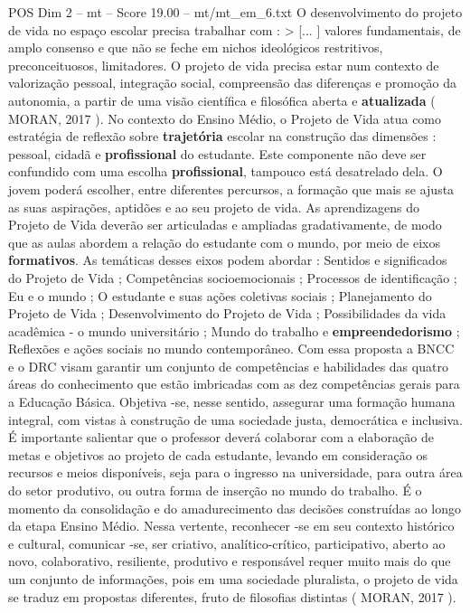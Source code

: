 \begin{textsample}{POS Dim 2 – mt – Score 19.00 – mt/mt\_em\_6.txt}
O desenvolvimento do projeto de vida no espaço escolar precisa trabalhar com : > [... ] valores fundamentais, de amplo consenso e que não se feche em nichos ideológicos restritivos, preconceituosos, limitadores.
O projeto de vida precisa estar num contexto de valorização pessoal, integração social, compreensão das diferenças e promoção da autonomia, a partir de uma visão científica e filosófica aberta e \textbf{atualizada} ( MORAN, 2017 ).
No contexto do Ensino Médio, o Projeto de Vida atua como estratégia de reflexão sobre \textbf{trajetória} escolar na construção das dimensões : pessoal, cidadã e \textbf{profissional} do estudante.
Este componente não deve ser confundido com uma escolha \textbf{profissional}, tampouco está desatrelado dela.
O jovem poderá escolher, entre diferentes percursos, a formação que mais se ajusta as suas aspirações, aptidões e ao seu projeto de vida.
As aprendizagens do Projeto de Vida deverão ser articuladas e ampliadas gradativamente, de modo que as aulas abordem a relação do estudante com o mundo, por meio de eixos \textbf{formativos}.
As temáticas desses eixos podem abordar : Sentidos e significados do Projeto de Vida ; Competências socioemocionais ; Processos de identificação ; Eu e o mundo ; O estudante e suas ações coletivas sociais ; Planejamento do Projeto de Vida ; Desenvolvimento do Projeto de Vida ; Possibilidades da vida acadêmica - o mundo universitário ; Mundo do trabalho e \textbf{empreendedorismo} ; Reflexões e ações sociais no mundo contemporâneo.
Com essa proposta a BNCC e o DRC visam garantir um conjunto de competências e habilidades das quatro áreas do conhecimento que estão imbricadas com as dez competências gerais para a Educação Básica.
Objetiva -se, nesse sentido, assegurar uma formação humana integral, com vistas à construção de uma sociedade justa, democrática e inclusiva.
É importante salientar que o professor deverá colaborar com a elaboração de metas e objetivos ao projeto de cada estudante, levando em consideração os recursos e meios disponíveis, seja para o ingresso na universidade, para outra área do setor produtivo, ou outra forma de inserção no mundo do trabalho.
É o momento da consolidação e do amadurecimento das decisões construídas ao longo da etapa Ensino Médio.
Nessa vertente, reconhecer -se em seu contexto histórico e cultural, comunicar -se, ser criativo, analítico-crítico, participativo, aberto ao novo, colaborativo, resiliente, produtivo e responsável requer muito mais do que um conjunto de informações, pois em uma sociedade pluralista, o projeto de vida se traduz em propostas diferentes, fruto de filosofias distintas ( MORAN, 2017 ).

\end{textsample}
